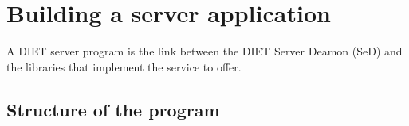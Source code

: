 
\chapter{Building a server application}
\label{ch:server}

A DIET server program is the link between the DIET Server Deamon (SeD) and the libraries that
implement the service to offer.

\section{Structure of the program}
\label{sec:sv_struct}

